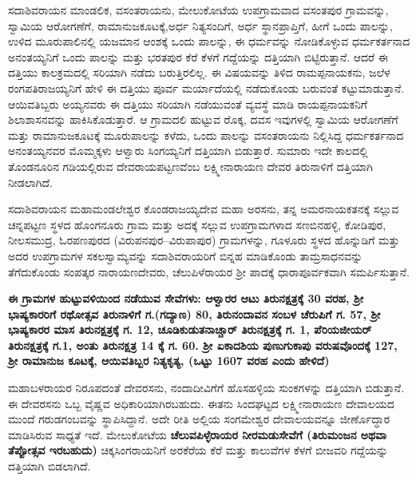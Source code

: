 ಸದಾಶಿವರಾಯನ ಮಾಂಡಲಿಕ, ವಸಂತರಾಯನು, ಮೇಲುಕೋಟೆಯ ಉಪಗ್ರಾಮವಾದ ವಸಂತಪುರ ಗ್ರಾಮವನ್ನು, ಸ್ವಾಮಿಯ ಆರೋಗಣೆಗೆ, ರಾಮಾನುಜಕೂಟಕ್ಕೆ,ಅರ್ಧ ನಿತ್ಯಸಂದಿಗೆ, ಅರ್ಧ ಸ್ಥಾನಪ್ರಾಪ್ತಿಗೆ, ಹೀಗೆ ಒಂದು ಪಾಲನ್ನು, ಉಳಿದ ಮೂರುಪಾಲಿನಲ್ಲಿ ಯಜಮಾನ ಆಂಶಕ್ಕೆ ಒಂದು ಪಾಲನ್ನು, ಈ ಧರ್ಮವನ್ನು ನೋಡಿಕೊಳ್ಳುವ ಧರ್ಮಕರ್ತನಾದ ಅನಂತಯ್ಯನಿಗೆ ಒಂದು ಪಾಲನ್ನು ಮತ್ತು ಭರತಪುರ ಕೆರೆ ಕೆಳಗೆ ಗದ್ದೆಯನ್ನು ದತ್ತಿಯಾಗಿ ಬಿಟ್ಟಿರುತ್ತಾನೆ. ಆದರೆ ಈ ದತ್ತಿಯು ಕಾಲಕ್ರಮದಲ್ಲಿ ಸರಿಯಾಗಿ ನಡೆದು ಬರುತ್ತಿರಲಿಲ್ಲ. ಈ ವಿಷಯವನ್ನು ತಿಳಿದ ರಾಮಪ್ಪನಾಯಕನು, ಜಲೆಳ ರಂಗಪತಿರಾಜಯ್ಯನಿಗೆ ಹೇಳಿ ಈ ದತ್ತಿಯು ಪೂರ್ವ ಮರ್ಯಾದೆಯಲ್ಲಿ ನಡೆದುಕೊಂಡು ಬರುವಂತೆ ಕಟ್ಟುಮಾಡುತ್ತಾನೆ. ಆಯಿವತಿಬ್ಬರು ಅಯ್ಯನವರು ಈ ದತ್ತಿಯು ಸರಿಯಾಗಿ ನಡೆಯುವಂತೆ ವ್ಯವಸ್ಥೆ ಮಾಡಿ ರಾಯಪ್ಪನಾಯಕನಿಗೆ ಶಿಲಾಶಾಸನವನ್ನು ಹಾಕಿಸಿಕೊಡುತ್ತಾರೆ. ಆ ಗ್ರಾಮದಲಿ ಹುಟ್ಟುವ ರೊಕ್ಕ, ದವಸ ಇವುಗಳಲ್ಲಿ ಸ್ವಾಮಿಯ ಆರೋಗಣೆಗೆ ಮತ್ತು ರಾಮಾನುಜಕೂಟಕ್ಕೆ ಮೂರುಪಾಲನ್ನು ಕಳೆದು, ಒಂದು ಪಾಲನ್ನು ವಸಂತರಾಯನು ನಿಲ್ಲಿಸಿದ್ದ ಧರ್ಮಕರ್ತನಾದ ಅನಂತಯ್ಯನವರ ಮೊಮ್ಮಕ್ಕಳು ಆಳ್ವಾರು ಸಿಂಗಯ್ಯನಿಗೆ ದತ್ತಿಯಾಗಿ ಬಿಡುತ್ತಾರೆ. ಸುಮಾರು ಇದೇ ಕಾಲದಲ್ಲಿ ತೊಂಡನೂರಿನ ಗಡಿಯಲ್ಲಿರುವ ದೇವರಾಯಪಟ್ಟಣವೆಂಬ ಲಕ್ಷ್ಮೀನಾರಾಯಣ ದೇವರ ತಿರುನಾಳಿಗೆ ದತ್ತಿಯಾಗಿ ನೀಡಲಾಗಿದೆ.

ಸದಾಶಿವರಾಯನ ಮಹಾಮಂಡಲೇಶ್ವರ ಕೊಂಡರಾಜಯ್ಯದೇವ ಮಹಾ ಅರಸನು, ತನ್ನ ಅಮರನಾಯಕತನಕ್ಕೆ ಸಲ್ಲುವ ಚನ್ನಪಟ್ಟಣ ಸ್ಥಳದ ಹೊಂಗನೂರು ಗ್ರಾಮ ಮತ್ತು ಅದಕ್ಕೆ ಸಲ್ಲುವ ಉಪಗ್ರಾಮಗಳಾದ ಸಣಬಿನಹಳ್ಳಿ, ಕೋಡಿಪುರ, ನೀಲಸಮುದ್ರ, ಓರಪಣಪುರದ (ವಿರುಪನಪುರ–ವಿರುಪಾಪುರ) ಗ್ರಾಮಗಳನ್ನು, ಗೂಳೂರು ಸ್ಥಳದ ಹೊನ್ನುಡಿಗೆ ಮತ್ತು ಅದರ ಉಪಗ್ರಾಮಗಳ ಸಕಲಸ್ವಾಮ್ಯವನ್ನು ಸದಾಶಿವರಾಯರಿಗೆ ಬಿನ್ನಹ ಮಾಡಿಕೊಂಡು ತಾಮ್ರಸಾಧನವನ್ನು ತೆಗೆದುಕೊಂಡು ಸಂಪತ್ಕರ ನಾರಾಯಣದೇವರು, ಚೆಲುಪಿಳೆರಾಯರ ಶ‍್ರೀ ಪಾದಕ್ಕೆ ಧಾರಾಪೂರ್ವಕವಾಗಿ ಸಮರ್ಪಿಸುತ್ತಾನೆ.

\textbf{ಈ ಗ್ರಾಮಗಳ ಹುಟ್ಟುವಳಿಯಿಂದ ನಡೆಯುವ ಸೇವೆಗಳು: ಆಳ್ವಾರರ ಆಟು ತಿರುನಕ್ಷತ್ರಕ್ಕೆ 30 ವರಹ, ಶ‍್ರೀ ಭಾಷ್ಯಕಾರರಿಗೆ ರಥೋತ್ಸವ ತಿರುನಾಳಿಗೆ ಗ.(ಗದ್ಯಾಣ) 80, ತಿರುನಂದಾವನ ಸಂಬಳ ಚೆರುಪಿಗೆ ಗ. 57, ಶ‍್ರೀ ಭಾಷ್ಯಕಾರರ ಮಾಸ ತಿರುನಕ್ಷತ್ರಕ್ಕೆ ಗ. 12, ಚೂಡಿಕುಡುತನಾಚ್ಚಾರ್​ ತಿರುನಕ್ಷತ್ರಕ್ಕೆ ಗ. 1, ಪೆರಿಯಜೀಯರ್​ ತಿರುನಕ್ಷತ್ರಕ್ಕೆ ಗ.1, ಅಂತು ತಿರುನಕ್ಷತ್ರ 14 ಕ್ಕೆ ಗ. 60. ಶ‍್ರೀ ಏಕಾದಶಿಯ ಪುಣುಗುಕಾಪು ವರುಷವೊಂದಕ್ಕೆ 127, ಶ‍್ರೀ ರಾಮಾನುಜ ಕೂಟಕ್ಕೆ, ಆಯಿವತಿಬ್ಬರ ನಿತ್ಯಕೃತ್ಯ, (ಒಟ್ಟು 1607 ವರಹ ಎಂದು ಹೇಳಿದೆ)}

ಮಹಾಬಳರಾಯರ ನಿರೂಪದಂತೆ ದೇವರಸನು, ನಂದಾದೀವಿಗೆಗೆ ಹೊಸಹಳ್ಳಿಯ ಸುಂಕಗಳನ್ನು ದತ್ತಿಯಾಗಿ ಬಿಡುತ್ತಾನೆ. ಈ ದೇವರಸನು ಒಬ್ಬ ವೈಷ್ಣವ ಅಧಿಕಾರಿಯಾಗಿರಬಹುದು. ಈತನು ಸಿಂದಘಟ್ಟದ ಲಕ್ಷ್ಮೀನಾರಾಯಣ ದೇವಾಲಯದ ಮುಂದೆ ಗರುಡಗಂಬವನ್ನು ಸ್ಥಾಪಿಸಿದ್ದಾನೆ. ಅದೇ ರೀತಿ ಅಲ್ಲಿಯ ಸಂಗಮೇಶ್ವರ ದೇವಾಲಯವನ್ನೂ ಜೀರ್ಣೊದ್ಧಾರ ಮಾಡಿಸಿರುವ ಸಾಧ್ಯತೆ ಇದೆ. ಮೇಲುಕೋಟೆಯ \textbf{ಚೆಲುವಪಿಳ್ಳೆರಾಯರ ನೀರಮಡುಸೇವೆಗೆ (ತಿರುಮಂಜನ ಅಥವಾ ತೆಪ್ಪೋತ್ಸವ ಇರಬಹುದು) }ಚಿಕ್ಕಸಿಂಗರಾಯನಿಗೆ ಅರಕೆರೆಯ ಕೆರೆ ಮತ್ತು ಕಾಲುವೆಗಳ ಕೆಳಗೆ ಬೀಜವರಿ ಗದ್ದೆಯನ್ನು ದತ್ತಿಯಾಗಿ ಬಿಡಲಾಗಿದೆ.

